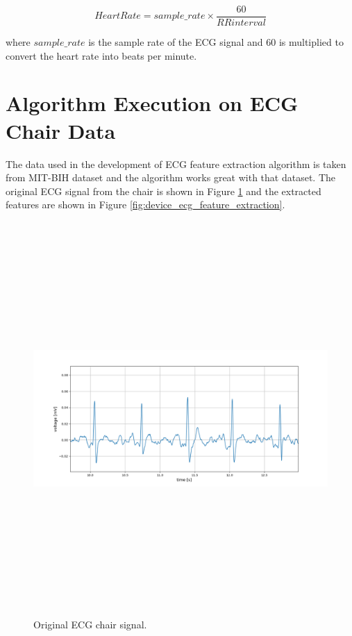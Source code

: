 \begin{equation}\label{eqn:heart_rate} 
HeartRate = sample\_rate \times \frac{60}{RR interval}
\end{equation}

where $sample\_rate$ is the sample rate of the ECG signal and 60 is multiplied to convert the heart rate into beats per minute.

\pagebreak

\section{Algorithm Execution on ECG Chair Data}
The data used in the development of ECG feature extraction algorithm is taken from MIT-BIH dataset and the algorithm works great with that dataset. The original ECG signal from the chair is shown in Figure \ref{fig:device_ecg_orignal} and the extracted features are shown in Figure \ref{fig:device_ecg_feature_extraction}.

\begin{figure}[htpb]
	\centering
	\includegraphics[width=15cm,height=15cm,keepaspectratio=true]{images/device_ecg_orignal}
	\caption{
		Original ECG chair signal.
	}
	\label{fig:device_ecg_orignal}
\end{figure}

